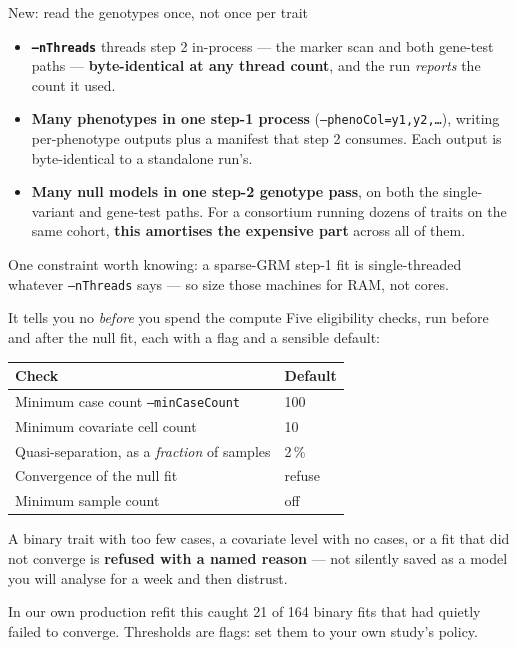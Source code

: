 \documentclass[aspectratio=169,11pt]{beamer}
\newcommand{\win}[1]{\textcolor{good}{\textbf{#1}}}
\begin{document}
\begin{frame}{New: read the genotypes once, not once per trait}
\begin{itemize}
  \item \win{\texttt{--nThreads}} threads step 2 in-process --- the marker scan
        and both gene-test paths --- \textbf{byte-identical at any thread count},
        and the run \emph{reports} the count it used.
  \item \win{Many phenotypes in one step-1 process}
        (\texttt{--phenoCol=y1,y2,\dots}), writing per-phenotype outputs plus a
        manifest that step 2 consumes. Each output is byte-identical to a
        standalone run's.
  \item \win{Many null models in one step-2 genotype pass}, on both the
        single-variant and gene-test paths. For a consortium running dozens of
        traits on the same cohort, \textbf{this amortises the expensive part}
        across all of them.
\end{itemize}

\medskip
{\footnotesize One constraint worth knowing: a sparse-GRM step-1 fit is
single-threaded whatever \texttt{--nThreads} says --- so size those machines for
RAM, not cores.}
\end{frame}

\begin{frame}{It tells you no \emph{before} you spend the compute}
Five eligibility checks, run before and after the null fit, each with a flag and
a sensible default:

\medskip
\begin{center}\small
\begin{tabular}{ll}
\toprule
Check & Default \\
\midrule
Minimum case count \texttt{--minCaseCount} & 100 \\
Minimum covariate cell count & 10 \\
Quasi-separation, as a \emph{fraction} of samples & 2\,\% \\
Convergence of the null fit & refuse \\
Minimum sample count & off \\
\bottomrule
\end{tabular}
\end{center}

\medskip
A binary trait with too few cases, a covariate level with no cases, or a fit that
did not converge is \textbf{refused with a named reason} --- not silently saved as
a model you will analyse for a week and then distrust.

\medskip
{\footnotesize In our own production refit this caught 21 of 164 binary fits that
had quietly failed to converge. Thresholds are flags: set them to your own study's
policy.}
\end{frame}
\end{document}
